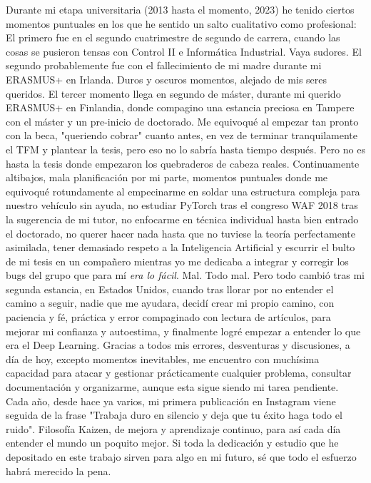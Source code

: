 Durante mi etapa universitaria (2013 hasta el momento, 2023) he tenido ciertos momentos puntuales en los que he sentido un salto cualitativo como profesional: El primero fue en el segundo cuatrimestre de segundo de carrera, cuando las cosas se pusieron tensas con Control II e Informática Industrial. Vaya sudores. El segundo probablemente fue con el fallecimiento de mi madre durante mi ERASMUS+ en Irlanda. Duros y oscuros momentos, alejado de mis seres queridos. El tercer momento llega en segundo de máster, durante mi querido ERASMUS+ en Finlandia, donde compagino una estancia preciosa en Tampere con el máster y un pre-inicio de doctorado. Me equivoqué al empezar tan pronto con la beca, "queriendo cobrar" cuanto antes, en vez de terminar tranquilamente el TFM y plantear la tesis, pero eso no lo sabría hasta tiempo después. Pero no es hasta la tesis donde empezaron los quebraderos de cabeza reales. Continuamente altibajos, mala planificación por mi parte, momentos puntuales donde me equivoqué rotundamente al empecinarme en soldar una estructura compleja para nuestro vehículo sin ayuda, no estudiar PyTorch tras el congreso WAF 2018 tras la sugerencia de mi tutor, no enfocarme en técnica individual hasta bien entrado el doctorado, no querer hacer nada hasta que no tuviese la teoría perfectamente asimilada, tener demasiado respeto a la Inteligencia Artificial y escurrir el bulto de mi tesis en un compañero mientras yo me dedicaba a integrar y corregir los bugs del grupo que para mí \textit{era lo fácil}. Mal. Todo mal. Pero todo cambió tras mi segunda estancia, en Estados Unidos, cuando tras llorar por no entender el camino a seguir, nadie que me ayudara, decidí crear mi propio camino, con paciencia y fé, práctica y error compaginado con lectura de artículos, para mejorar mi confianza y autoestima, y finalmente logré empezar a entender lo que era el Deep Learning. Gracias a todos mis errores, desventuras y discusiones, a día de hoy, excepto momentos inevitables, me encuentro con muchísima capacidad para atacar y gestionar prácticamente cualquier problema, consultar documentación y organizarme, aunque esta sigue siendo mi tarea pendiente. \\

Cada año, desde hace ya varios, mi primera publicación en Instagram viene seguida de la frase "Trabaja duro en silencio y deja que tu éxito haga todo el ruido". Filosofía Kaizen, de mejora y aprendizaje continuo, para así cada día entender el mundo un poquito mejor. Si toda la dedicación y estudio que he depositado en este trabajo sirven para algo en mi futuro, sé que todo el esfuerzo habrá merecido la pena. \\

